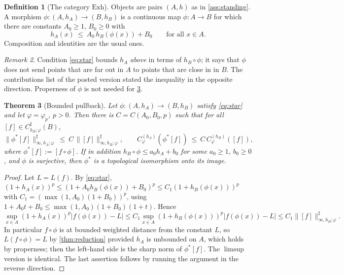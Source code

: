 \documentclass[11pt,a4paper]{article}
\numberwithin{equation}{section}
\theoremstyle{plain}
\newtheorem{theorem}{Theorem}[section]
\theoremstyle{definition}
\newtheorem{definition}[theorem]{Definition}
\theoremstyle{remark}
\newtheorem{remark}[theorem]{Remark}
\begin{document}
\begin{definition}[The category $\mathrm{Exh}$]\label{def:Exh}
Objects are pairs $(A,h)$ as in \cref{ass:standing}. A morphism
$\phi:(A,h_A)\to(B,h_B)$ is a continuous map $\phi:A\to B$ for which there are constants
$A_0\ge1$, $B_0\ge0$ with
\begin{equation}\label{eq:star}
h_A(x)\ \le\ A_0\,h_B(\phi(x))+B_0\qquad\text{for all }x\in A. \tag{$\star$}
\end{equation}
Composition and identities are the usual ones.
\end{definition}

\begin{remark}
Condition \eqref{eq:star} bounds $h_A$ \emph{above} in terms of $h_B\circ\phi$; it says
that $\phi$ does not send points that are far out in $A$ to points that are close in in
$B$. The contributions list of the posted version stated the inequality in the opposite
direction. Properness of $\phi$ is not needed for \cref{thm:pullback}.
\end{remark}

\begin{theorem}[Bounded pullback]\label{thm:pullback}
Let $\phi:(A,h_A)\to(B,h_B)$ satisfy \eqref{eq:star} and let $\varphi=\varphi_p$, $p>0$.
Then there is $C=C(A_0,B_0,p)$ such that for all $[f]\in C^{\sharp}_{h_B;\varphi}(B)$,
\[
\|\phi^{\ast}[f]\|^{\sharp}_{\infty,h_A;\varphi}\ \le\ C\,\|[f]\|^{\sharp}_{\infty,h_B;\varphi},
\qquad
C^{(h_A)}_{\varphi}(\phi^{\ast}[f])\ \le\ C\,C^{(h_B)}_{\varphi}([f]),
\]
where $\phi^{\ast}[f]:=[f\circ\phi]$. If in addition $h_B\circ\phi\le a_0h_A+b_0$ for some
$a_0\ge1$, $b_0\ge0$, and $\phi$ is surjective, then $\phi^{\ast}$ is a topological
isomorphism onto its image.
\end{theorem}

\begin{proof}
Let $L=L(f)$. By \eqref{eq:star},
$(1+h_A(x))^{p}\le(1+A_0h_B(\phi(x))+B_0)^{p}\le C_1(1+h_B(\phi(x)))^{p}$ with
$C_1=(\max(1,A_0)(1+B_0))^{p}$, using $1+A_0t+B_0\le\max(1,A_0)(1+B_0)(1+t)$. Hence
\[
\sup_{x\in A}(1+h_A(x))^{p}|f(\phi(x))-L|
\le C_1\sup_{x\in A}(1+h_B(\phi(x)))^{p}|f(\phi(x))-L|
\le C_1\|[f]\|^{\sharp}_{\infty,h_B;\varphi}.
\]
In particular $f\circ\phi$ is at bounded weighted distance from the constant $L$, so
$L(f\circ\phi)=L$ by \cref{thm:reduction} provided $h_A$ is unbounded on $A$, which holds
by properness; then the left-hand side is the sharp norm of $\phi^{\ast}[f]$. The
$\limsup$ version is identical. The last assertion follows by running the argument in the
reverse direction.
\end{proof}
\end{document}
